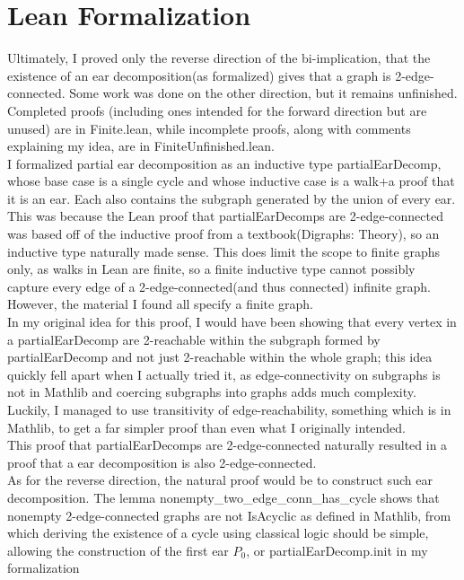 \documentclass{article}
\begin{document}
\section{Lean Formalization}
Ultimately, I proved only the reverse direction of the bi-implication, that the existence of an ear decomposition(as formalized) gives that a graph is 2-edge-connected. Some work was done on the other direction, but it remains unfinished. Completed proofs (including ones intended for the forward direction but are unused) are in Finite.lean, while incomplete proofs, along with comments explaining my idea, are in FiniteUnfinished.lean.
\\I formalized partial ear decomposition as an inductive type partialEarDecomp, whose base case is a single cycle and whose inductive case is a walk+a proof that it is an ear. Each also contains the subgraph generated by the union of every ear. 
\\ This was because the Lean proof that partialEarDecomps are 2-edge-connected was based off of the inductive proof from a textbook(Digraphs: Theory), so an inductive type naturally made sense. This does limit the scope to finite graphs only, as walks in Lean are finite, so a finite inductive type cannot possibly capture every edge of a 2-edge-connected(and thus connected) infinite graph. However, the material I found all specify a finite graph. 
\\ In my original idea for this proof, I would have been showing that every vertex in a partialEarDecomp are 2-reachable within the subgraph formed by partialEarDecomp and not just 2-reachable within the whole graph; this idea quickly fell apart when I actually tried it, as edge-connectivity on subgraphs is not in Mathlib and coercing subgraphs into graphs adds much complexity. Luckily, I managed to use transitivity of edge-reachability, something which is in Mathlib, to get a far simpler proof than even what I originally intended.
\\ This proof that partialEarDecomps are 2-edge-connected naturally resulted in a proof that a ear decomposition is also 2-edge-connected.
\\ As for the reverse direction, the natural proof would be to construct such ear decomposition. The lemma nonempty\_two\_edge\_conn\_has\_cycle shows that nonempty 2-edge-connected graphs are not IsAcyclic as defined in Mathlib, from which deriving the existence of a cycle using classical logic should be simple, allowing the construction of the first ear $P_0$, or partialEarDecomp.init in my formalization
\end{document}
